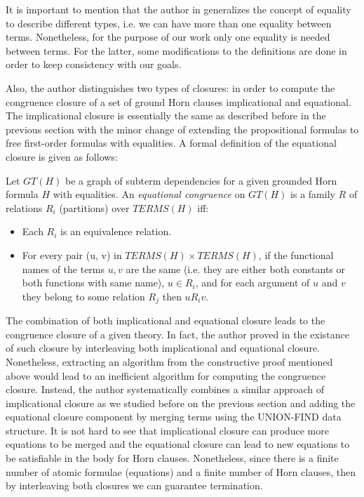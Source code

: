 It is important to mention that the author in \cite{GALLIER1987233} generalizes
the concept of equality to describe different types, i.e. we can have more than
one equality between terms. Nonetheless, for the purpose of our work only
one equality is needed between terms. For the latter, some modifications
to the definitions are done in order to keep consistency with our goals.

Also, the author distinguishes two types of closures: in order to compute
the congruence closure of a set of ground Horn clauses implicational and
equational. The implicational closure is essentially the same as described
before in the previous section with the minor change of extending the propositional
formulas to free first-order formulas with equalities. A formal definition of
the equational closure is given as follows:

 Let $GT(H)$ be a graph of subterm dependencies for
a given grounded Horn formula $H$ with equalities. An \textit{equational congruence} on $GT(H)$
is a family $R$ of relations $R_i$ (partitions) over $TERMS(H)$ iff:

\begin{itemize}
\item Each $R_i$ is an equivalence relation.
\item For every pair (u, v) in $TERMS(H) \times TERMS(H)$, if the functional names
  of the terms $u, v$ are the same (i.e. they are either both constants or both functions with same name),
  $u \in R_i$, and for each argument of $u$ and $v$ they belong to some relation $R_j$ then $uR_iv$. 
\end{itemize}

The combination of both implicational and equational closure leads to the
congruence closure of a given theory. In fact, the author proved in \cite{GALLIER1987233}
the existance of such closure by interleaving both implicational and equational closure.
Nonetheless, extracting an algorithm from the constructive proof mentioned above
would lead to an inefficient algorithm for computing the congruence closure. Instead, the
author systematically combines a similar approach of implicational closure as we studied
before on the previous section and adding the equational closure component by merging
terms using the UNION-FIND data structure. It is not hard to see that implicational closure
can produce more equations to be merged and the equational closure can lead to new equations
to be satisfiable in the body for Horn clauses. Nonetheless, since there is a finite
number of atomic formulae (equations) and a finite number of Horn clauses, then by interleaving
both closures we can guarantee termination.

